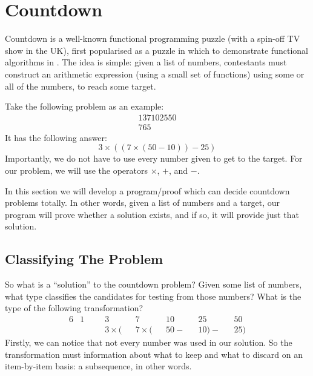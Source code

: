 \chapter{Countdown}
Countdown is a well-known functional programming puzzle (with a spin-off TV show
in the UK), first popularised as a puzzle in which to demonstrate functional
algorithms in \cite{huttonCountdownProblem2002}.
The idea is simple: given a list of numbers, contestants must construct an
arithmetic expression (using a small set of functions) using some or all of the
numbers, to reach some target.

Take the following problem as an example:
\begin{gather*}
  \boxed{1} \boxed{3} \boxed{7} \boxed{10} \boxed{25} \boxed{50} \\
  \boxed{765} \tag{Target}
\end{gather*}
It has the following answer:
\begin{equation}
  3 \times ((7 \times (50 - 10)) - 25)
\end{equation}
Importantly, we do not have to use every number given to get to the target.
For our problem, we will use the operators \(\times\), \(+\), and \(-\).

In this section we will develop a program/proof which can decide countdown
problems totally.
In other words, given a list of numbers and a target, our program will prove
whether a solution exists, and if so, it will provide just that solution.
\section{Classifying The Problem}
So what is a ``solution'' to the countdown problem?
Given some list of numbers, what type classifies the candidates for testing from
those numbers?
What is the type of the following transformation?
\begin{alignat*}{6}
  &1 \; \; \;         &&3         &&7    &&10    &&25  &&50 \\
  &&&3 \times (&&7 \times (&&50 - &&10) - &&25)
\end{alignat*}
Firstly, we can notice that not every number was used in our solution.
So the transformation must information about what to keep and what to discard on
an item-by-item basis: a subsequence, in other words.

